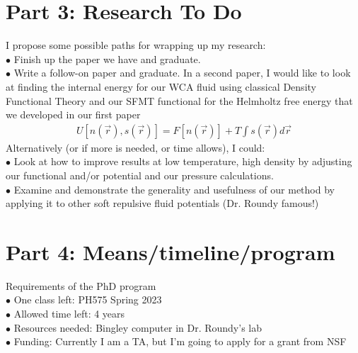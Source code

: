 \documentclass[double,12pt]{revtex4-2}
\begin{document}
\section{Part 3: Research To Do}
\noindent %
I propose some possible paths for wrapping up my research: \\
$\bullet$ Finish up the paper we have and graduate. \\
$\bullet$ Write a follow-on paper and graduate. In a second paper, I would 
like to look at finding the internal energy for our WCA fluid using 
classical Density Functional Theory and our SFMT functional 
for the Helmholtz free energy that we developed in our first paper 
\begin{align}
  U[n(\vec r), s(\vec r)] = F[n(\vec r)] + T\int s(\vec r) d\vec r
\end{align}
 Alternatively (or if more is needed, or time allows), I could: \\
$\bullet$ Look at how to improve results at low temperature, high density 
by adjusting our functional and/or potential and our pressure calculations.\\ %
$\bullet$ Examine and demonstrate the generality and usefulness of our 
method by applying it to other soft repulsive fluid potentials (Dr. Roundy famous!) \\

\section{Part 4: Means/timeline/program}
\noindent Requirements of the PhD program \\
$\bullet$ One class left: PH575 Spring 2023 \\
$\bullet$ Allowed time left: 4 years \\
$\bullet$ Resources needed: Bingley computer in Dr. Roundy's lab \\
$\bullet$ Funding: Currently I am a TA, but I'm going to apply for a grant from NSF \\
\end{document}
